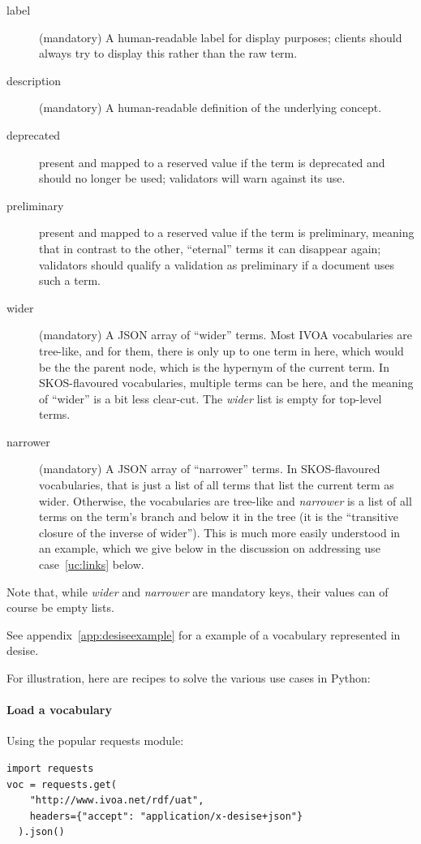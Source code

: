 \documentclass[11pt,a4paper]{ivoa}
\begin{document}
\begin{description}
\item[label] (mandatory) 
A human-readable label for display purposes; clients should
always try to display this rather than the raw term.

\item[description] (mandatory) A human-readable definition of the underlying
concept.

\item[deprecated] present and mapped to a reserved value if the term is
deprecated and should no longer be used; validators will warn against
its use.

\item[preliminary] present and mapped to a reserved value if the term
is preliminary, meaning that in contrast to the other, ``eternal'' terms
it can disappear again; validators should qualify a validation as
preliminary if a document uses such a term.

\item[wider] (mandatory) A JSON array
of ``wider'' terms.  Most IVOA vocabularies are
tree-like, and for them, there is only up to one term in here, which
would be the the parent node, which is the hypernym of the current term.
In SKOS-flavoured vocabularies, multiple terms can be here, and the
meaning of ``wider'' is a bit less clear-cut.  The \textit{wider} list
is empty for top-level terms.

\item[narrower] (mandatory) A JSON array
of ``narrower'' terms.  In SKOS-flavoured
vocabularies, that is just a list of all terms that list the current
term as wider.  Otherwise, the vocabularies are tree-like and
\textit{narrower} is a list of all terms on the term's branch and below
it in the tree (it is the ``transitive closure of the inverse of
wider'').  This is much more easily understood in an example, which we
give below in the discussion on addressing use case~\ref{uc:links} below.
\end{description}

Note that, while \textit{wider} and \textit{narrower} are mandatory
keys, their values can of course be empty lists.

See appendix~\ref{app:desiseexample} for a example of a vocabulary
represented in desise.

For illustration, here are recipes to solve the various use cases in
Python:

\paragraph{Load a vocabulary} Using the popular requests module:\\
\begin{lstlisting}
import requests
voc = requests.get(
    "http://www.ivoa.net/rdf/uat", 
    headers={"accept": "application/x-desise+json"}
  ).json()
\end{lstlisting}
\end{document}
